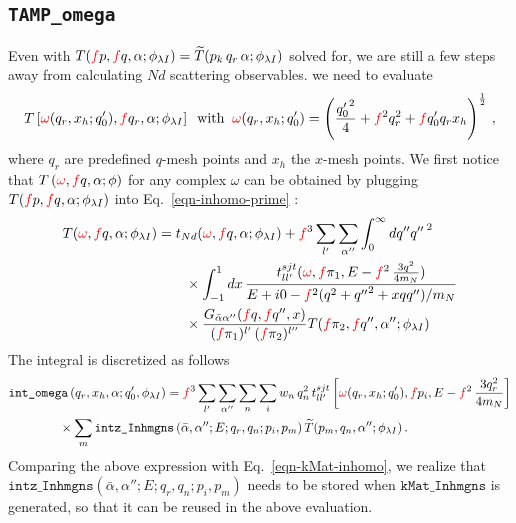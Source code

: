 \documentclass[11pt,aps]{revtex4}
\newcommand{\PF}{{\color{red}f}}
\newcommand{\cmplx}[1]{{\color{red} #1 }}
\begin{document}
\subsection{\texttt{TAMP\_omega}}
Even with $T(\PF p, \PF q, \alpha; \phi_{\lambda I}) = \widetilde{T}(p_k\, q_r\, \alpha; \phi_{\lambda I})$ solved for, we are still a few steps away from calculating $N d$ scattering observables.
we need to evaluate
\begin{equation}
  T\left[\cmplx{\omega}(q_r, x_h; q_0'), \PF q_r, \alpha; \phi_{\lambda I} \right] \;\; \text{with}\; \; \cmplx{\omega}(q_r, x_h; q_0') = \left(\frac{{q'_0}^2}{4} + \PF^2 q_r^2 + \PF {q'_0} q_r x_h \right)^{\frac{1}{2}} \, ,
\end{equation}
where $q_r$ are predefined $q$-mesh points and $x_h$ the $x$-mesh points.
We first notice that $T\left(\cmplx{\omega}, \PF q, \alpha; \phi \right)$ for any complex $\omega$ can be obtained by plugging $T(\PF p, \PF q, \alpha; \phi_{\lambda I})$ into Eq.~\eqref{eqn-inhomo-prime} :
\begin{equation}
\begin{split}
  T(\cmplx{\omega}, \PF q, \alpha; \phi_{\lambda I}) &= t_{Nd}(\cmplx{\omega}, \PF q, \alpha; \phi_{\lambda I}) + \PF^3 \sum_{l'}\sum_{\alpha''} \int_0^\infty dq'' {q''\,}^2 \\
    & \qquad \times \int_{-1}^1{dx} \, \frac{t_{ll'}^{sjt} (\cmplx{\omega}, \PF \pi_1, E - \PF^2\, \frac{3q^2}{4m_N})}{E + i0 - \PF^2 (q^2 + {q''}^2 + x q q'')/m_N} \\
    & \qquad \times \frac{G_{\bar{\alpha}\alpha''}(\PF q, \PF q'', x)}{(\PF \pi_1)^{l'} \, (\PF \pi_2)^{l''}} T(\PF \pi_2, \PF q'', \alpha''; \phi_{\lambda I})
\end{split}
\end{equation}
The integral is discretized as follows
\begin{equation}
\begin{split}
  & \texttt{int\_omega}\left(q_r, x_h, \alpha; q_0', \phi_{\lambda I} \right) = \PF^3 \sum_{l'}\sum_{\alpha''} \sum_n \sum_i w_n\, {q}_n^2\, t_{ll'}^{sjt} \left[\cmplx{\omega}(q_r, x_h; q_0'), \PF p_i, E - \PF^2\, \frac{3q_r^2}{4m_N}\right] \\
  & \qquad \qquad \times  \sum_m \texttt{intz\_Inhmgns}\left(\bar{\alpha}, \alpha''; E; q_r, q_n; p_i, p_m\right) \widetilde{T}(p_m, q_n, \alpha''; \phi_{\lambda I}) \, .
\end{split}
\end{equation}
Comparing the above expression with Eq.~\eqref{eqn-kMat-inhomo}, we realize that $\texttt{intz\_Inhmgns}\left(\bar{\alpha}, \alpha''; E; q_r, q_n; p_i, p_m\right)$
needs to be stored when $\texttt{kMat\_Inhmgns}$ is generated, so that it can be reused in the above evaluation.
\end{document}
